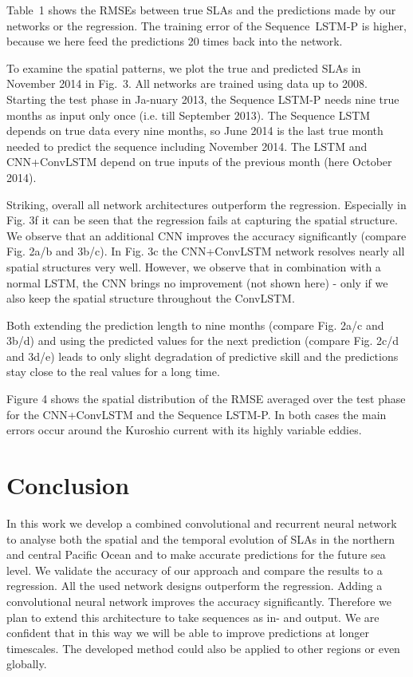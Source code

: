\documentclass{article}
\begin{document}
Table~1 shows the RMSEs between true SLAs and the predictions made by our networks or the regression. The training error of the \mbox{Sequence LSTM-P} is higher, because we here feed the predictions 20 times back into the network.

To examine the spatial patterns, we plot the true and predicted SLAs in November 2014 in Fig.~3. All networks are trained using data up to 2008. Starting the test phase in Ja-nuary 2013, the Sequence LSTM-P needs nine true months as input only once (i.e. till September 2013). The Sequence LSTM depends on true data every nine months, so June 2014 is the last true month needed to predict the sequence including November 2014. The LSTM and CNN+ConvLSTM depend on true inputs of the previous month (here October 2014).

Striking, overall all network architectures outperform the regression. Especially in Fig. 3f it can be seen that the regression fails at capturing the spatial structure. We observe that an additional CNN improves the accuracy significantly (compare Fig. 2a/b and 3b/c). In Fig. 3c the CNN+ConvLSTM network resolves nearly all spatial structures very well. However, we observe that in combination with a normal LSTM, the CNN brings no improvement (not shown here) - only if we also keep the spatial structure throughout the ConvLSTM.

Both extending the prediction length to nine months (compare Fig. 2a/c and 3b/d)  and using the predicted values for the next prediction (compare Fig. 2c/d and 3d/e) leads to only slight degradation of predictive skill and the predictions stay close to the real values for a long time.

Figure 4 shows the spatial distribution of the RMSE \linebreak averaged over the test phase for the CNN+ConvLSTM and the Sequence LSTM-P. In both cases the main errors occur around the Kuroshio current with its highly variable eddies.

\section{Conclusion}
\label{sec:print}

In this work we develop a combined convolutional and recurrent neural network to analyse both the spatial and the temporal evolution of SLAs in the northern and central Pacific Ocean and to make accurate predictions for the future sea level. We validate the accuracy of our approach and compare the results to a regression. All the used network designs outperform the regression. Adding a convolutional neural network improves the accuracy significantly.
Therefore we plan to extend this architecture to take sequences as in- and output. We are confident that in this way we will be able to improve predictions at longer timescales. The developed method could also be applied to other regions or even globally.
\end{document}
